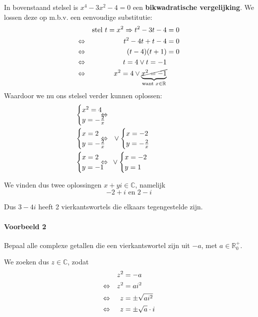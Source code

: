 \documentclass[12pt,twoside]{article}
\begin{document}
In bovenstaand stelsel is $x^4-3x^2-4=0$ een {\bf bikwadratische vergelijking}. We lossen deze op m.b.v. een eenvoudige substitutie:
\begin{align*}
  &&\mbox{stel } t=x^2
  \Rightarrow t^2-3t-4&=0\\
  \Leftrightarrow && t^2-4t+t-4 &= 0\\
  \Leftrightarrow && (t-4)(t+1) &= 0\\
  \Leftrightarrow && t=4 \vee t=-1\\
  \Leftrightarrow && x^2=4 \vee \underbrace{\cancel{x^2=-1}}_{\text{want }x\in\mathbb{R}}
\end{align*}
Waardoor we nu ons stelsel verder kunnen oplossen:
\begin{align*}
 \LRA && &\hspace*{-2cm}\begin{cases}x^2=4\\y=-\frac{2}{x}\end{cases}\\
 \LRA && &\hspace*{-2cm}\begin{cases}x=2\\y=-\frac{2}{x}\end{cases} \vee \begin{cases}x=-2\\y=-\frac{2}{x}\end{cases}\\
 \LRA && &\hspace*{-2cm}\begin{cases}x=2\\y=-1\end{cases} \vee \begin{cases}x=-2\\y=1\end{cases}
\end{align*}

We vinden dus twee oplossingen $x+yi\in\mathbb{C}$, namelijk
$$-2+i \mbox{ en } 2-i$$

Dus $3-4i$ heeft 2 vierkantswortels die elkaars tegengestelde zijn.

\paragraph*{Voorbeeld 2}
Bepaal alle complexe getallen die een vierkantswortel zijn uit $-a$, met $a\in\mathbb{R}^+_0$.

We zoeken dus $z \in \mathbb{C}$, zodat
\begin{align*}
              && z^2 &= -a\\
         \Leftrightarrow && z^2 &= ai^2\\
         \Leftrightarrow && z   &= \pm \sqrt{ai^2}\\
         \Leftrightarrow && z   &= \pm \sqrt{a}\cdot i
\end{align*}
\end{document}
